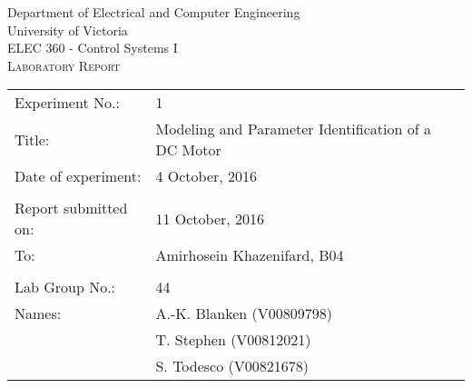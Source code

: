 \begin{titlepage}

\begin{center}
	\begin{LARGE}
		Department of Electrical and Computer Engineering \\
		University of Victoria \\
		ELEC 360 - Control Systems I \\[1cm]
		\textsc{Laboratory Report}
		\\[1cm]
	\end{LARGE}
\end{center}

\begin{tabular}{ p{} p{} }
	Experiment No.: & 1 \\ 
	Title: & Modeling and Parameter Identification of a DC Motor \\ 
	Date of experiment:& 4 October, 2016 \\ 
	& \\
	Report submitted on:& 11 October, 2016 \\ 
	To: & Amirhosein Khazenifard, B04 \\ 
	& \\
  Lab Group No.: & 44 \\
	Names: & A.-K. Blanken (V00809798)\\
	& T. Stephen (V00812021) \\
  & S. Todesco (V00821678)
\end{tabular}

\end{titlepage}
